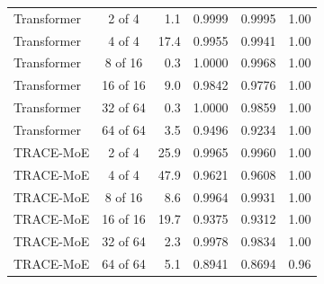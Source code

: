 \begin{table}[!htbp]
{\begin{tabular}{lcrrrr}
\midrule
Transformer & 2 of 4 & 1.1 & 0.9999 & 0.9995 & 1.00 \\
Transformer & 4 of 4 & 17.4 & 0.9955 & 0.9941 & 1.00 \\
Transformer & 8 of 16 & 0.3 & 1.0000 & 0.9968 & 1.00 \\
Transformer & 16 of 16 & 9.0 & 0.9842 & 0.9776 & 1.00 \\
Transformer & 32 of 64 & 0.3 & 1.0000 & 0.9859 & 1.00 \\
Transformer & 64 of 64 & 3.5 & 0.9496 & 0.9234 & 1.00 \\
\midrule
TRACE-MoE & 2 of 4 & 25.9 & 0.9965 & 0.9960 & 1.00 \\
TRACE-MoE & 4 of 4 & 47.9 & 0.9621 & 0.9608 & 1.00 \\
TRACE-MoE & 8 of 16 & 8.6 & 0.9964 & 0.9931 & 1.00 \\
TRACE-MoE & 16 of 16 & 19.7 & 0.9375 & 0.9312 & 1.00 \\
TRACE-MoE & 32 of 64 & 2.3 & 0.9978 & 0.9834 & 1.00 \\
TRACE-MoE & 64 of 64 & 5.1 & 0.8941 & 0.8694 & 0.96 \\
\bottomrule
\end{tabular}
}
\end{table}
